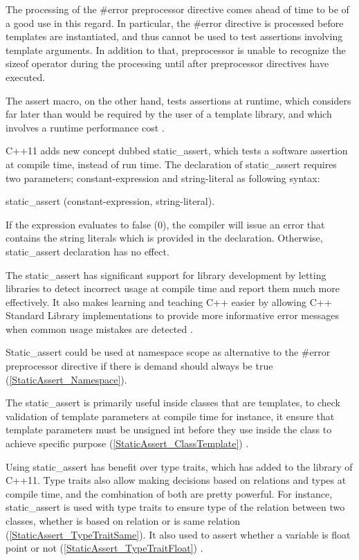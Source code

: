 \documentclass[11pt]{report}
\begin{document}
The processing of the \#error preprocessor directive comes ahead of time to be of a good use in this regard. In particular, the \#error directive is processed before templates are instantiated, and thus cannot be used to test assertions involving template arguments. In addition to that, preprocessor is unable to recognize the sizeof operator during the processing until after preprocessor directives have executed.


The assert macro, on the other hand, tests assertions at runtime, which considers far later than would be required by the user of a template library, and which involves a runtime performance cost \cite{Stroustrup:2012:Cpp11}.


C++11 adds new concept dubbed static\_assert, which tests a software assertion at compile time, instead of run time. The declaration of static\_assert requires two parameters; constant-expression and string-literal as following syntax:
\begin{center}
static\_assert (constant-expression, string-literal).
\end{center}

If the expression evaluates to false (0), the compiler will issue an error that contains the string literals which is provided in the declaration. Otherwise, static\_assert declaration has no effect.


The static\_assert has significant support for library development by letting libraries to detect incorrect usage at compile time and report them much more effectively. It also makes learning and teaching C++ easier by allowing C++ Standard Library implementations to provide more informative error messages when common usage mistakes are detected \cite{MSDN:2012:CppModern}.


Static\_assert could be used at namespace scope as alternative to the \#error preprocessor directive if there is demand should always be true (\ref{StaticAssert_Namespace}).


The static\_assert is primarily useful inside classes that are templates, to check validation of template parameters at compile time for instance, it ensure that template parameters must be unsigned int before they use inside the class  to achieve specific purpose (\ref{StaticAssert_ClassTemplate}) \cite{Deitel:2012:CPP}.


Using static\_assert has benefit over type traits, which has added to the library of C++11. Type traits also allow making decisions based on relations and types at compile time, and the combination of both are pretty powerful. For instance, static\_assert is used with type traits to ensure type of the relation between two classes, whether is based on relation or is same relation (\ref{StaticAssert_TypeTraitSame}). It also used to assert whether a variable is float point or not (\ref{StaticAssert_TypeTraitFloat}) \cite{Gregorie:professionalcpp}.
\end{document}
